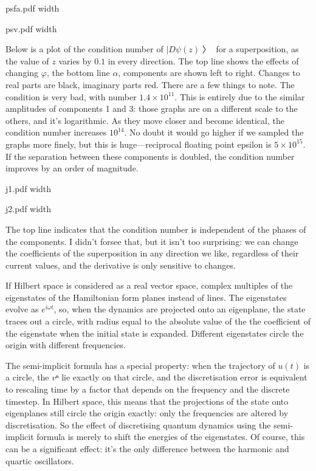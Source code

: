 \centerline{\XeTeXpicfile psfa.pdf width \hsize}

\centerline{\XeTeXpicfile psv.pdf width \hsize}

Below is a plot of the condition number of $|Dψ(z)〉$ for a superposition, as the value of $z$ varies by $0.1$ in every direction.  The top line shows the effects of changing $φ$, the bottom line $α$, components are shown left to right.  Changes to real parts are black, imaginary parts red.  There are a few things to note.  The condition is very bad, with number $1.4×10^{11}$.  This is entirely due to the similar amplitudes of components 1 and 3: those graphs are on a different scale to the others, and it's logarithmic.  As they move closer and become identical, the condition number increases $10^{14}$.  No doubt it would go higher if we sampled the graphs more finely, but this is huge—reciprocal floating point epsilon is $5×10^{15}$.  If the separation between these components is doubled, the condition number improves by an order of magnitude.

\centerline{\XeTeXpicfile j1.pdf width \hsize}

\centerline{\XeTeXpicfile j2.pdf width \hsize}

The top line indicates that the condition number is independent of the phases of the components.  I didn't forsee that, but it isn't too surprising: we can change the coefficients of the superposition in any direction we like, regardless of their current values, and the derivative is only sensitive to changes.


If Hilbert space is considered as a real vector space, complex multiples of the eigenstates of the Hamiltonian form planes instead of lines.  The eigenstates evolve as $e^{iωt}$, so, when the dynamics are projected onto an eigenplane, the state traces out a circle, with radius equal to the absolute value of the the coefficient of the eigenstate when the initial state is expanded.  Different eigenstates circle the origin with different frequencies.

The semi-implicit formula has a special property: when the trajectory of $u(t)$ is a circle, the $vⁿ$ lie exactly on that circle, and the discretisation error is equivalent to rescaling time by a factor that depends on the frequency and the discrete timestep.  In Hilbert space, this means that the projections of the state onto eigenplanes still circle the origin exactly: only the frequencies are altered by discretisation.  So the effect of discretising quantum dynamics using the semi-implicit formula is merely to shift the energies of the eigenstates.  Of course, this can be a significant effect: it's the only difference between the harmonic and quartic oscillators.

